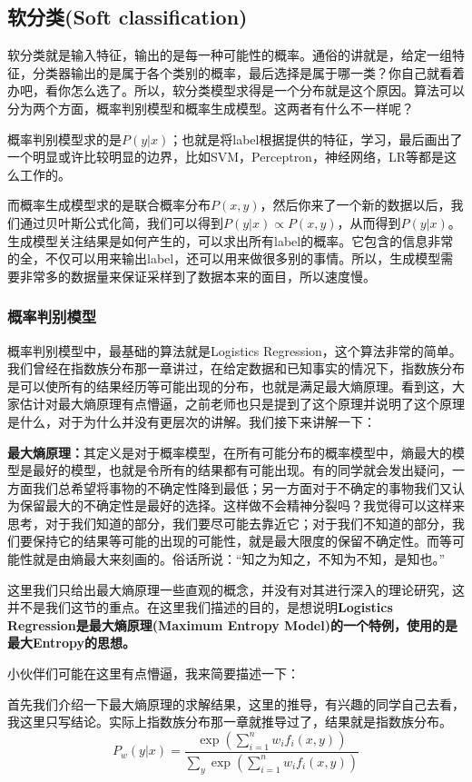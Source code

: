 \documentclass[a4paper]{article}
\begin{document}
\subsection{软分类(Soft classification)}
软分类就是输入特征，输出的是每一种可能性的概率。通俗的讲就是，给定一组特征，分类器输出的是属于各个类别的概率，最后选择是属于哪一类？你自己就看着办吧，看你怎么选了。所以，软分类模型求得是一个分布就是这个原因。算法可以分为两个方面，概率判别模型和概率生成模型。这两者有什么不一样呢？

概率判别模型求的是$P(y|x)$；也就是将label根据提供的特征，学习，最后画出了一个明显或许比较明显的边界，比如SVM，Perceptron，神经网络，LR等都是这么工作的。

而概率生成模型求的是联合概率分布$P(x,y)$，然后你来了一个新的数据以后，我们通过贝叶斯公式化简，我们可以得到$P(y|x) \propto P(x,y)$，从而得到$P(y|x)$。生成模型关注结果是如何产生的，可以求出所有label的概率。它包含的信息非常的全，不仅可以用来输出label，还可以用来做很多别的事情。所以，生成模型需要非常多的数据量来保证采样到了数据本来的面目，所以速度慢。
\subsubsection{概率判别模型}
概率判别模型中，最基础的算法就是Logistics Regression，这个算法非常的简单。我们曾经在指数族分布那一章讲过，在给定数据和已知事实的情况下，指数族分布是可以使所有的结果经历等可能出现的分布，也就是满足最大熵原理。看到这，大家估计对最大熵原理有点懵逼，之前老师也只是提到了这个原理并说明了这个原理是什么，对于为什么并没有更层次的讲解。我们接下来讲解一下：

\textbf{最大熵原理：}其定义是对于概率模型，在所有可能分布的概率模型中，熵最大的模型是最好的模型，也就是令所有的结果都有可能出现。有的同学就会发出疑问，一方面我们总希望将事物的不确定性降到最低；另一方面对于不确定的事物我们又认为保留最大的不确定性是最好的选择。这样做不会精神分裂吗？我觉得可以这样来思考，对于我们知道的部分，我们要尽可能去靠近它；对于我们不知道的部分，我们要保持它的结果等可能的出现的可能性，就是最大限度的保留不确定性。而等可能性就是由熵最大来刻画的。俗话所说：“知之为知之，不知为不知，是知也。”

这里我们只给出最大熵原理一些直观的概念，并没有对其进行深入的理论研究，这并不是我们这节的重点。在这里我们描述的目的，是想说明\textbf{Logistics Regression是最大熵原理(Maximum Entropy Model)的一个特例，使用的是最大Entropy的思想。}

小伙伴们可能在这里有点懵逼，我来简要描述一下：

首先我们介绍一下最大熵原理的求解结果，这里的推导，有兴趣的同学自己去看，我这里只写结论。实际上指数族分布那一章就推导过了，结果就是指数族分布。
\begin{equation}
    P_w(y|x) = \frac{\exp (\sum_{i=1}^n w_if_i(x,y))}{\sum_y \exp \left( \sum_{i=1}^n w_if_i(x,y) \right)}
\end{equation}
\end{document}
